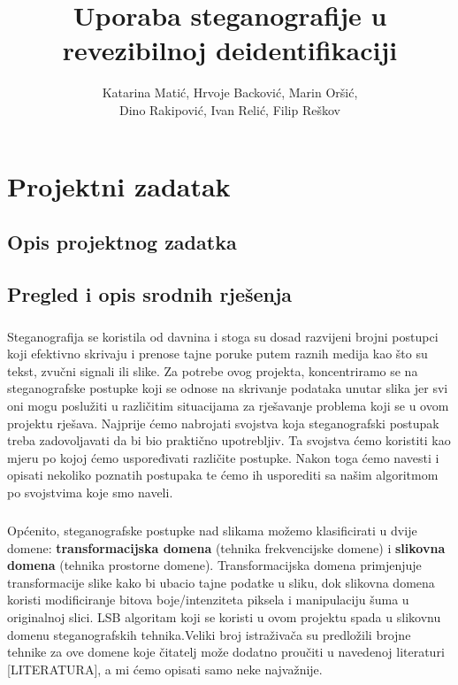 \documentclass[times, utf8, seminar]{fer}
\begin{document}
\title{Uporaba steganografije u revezibilnoj deidentifikaciji}

\author{	Katarina Matić,
	Hrvoje Backović,
	Marin Oršić,\\
	Dino Rakipović,
	Ivan Relić,
	Filip Reškov	}



\maketitle

\tableofcontents

\chapter{Projektni zadatak}
\section{Opis projektnog zadatka}
\section{Pregled i opis srodnih rješenja}

\paragraph{}
Steganografija se koristila od davnina i stoga su dosad razvijeni brojni postupci koji efektivno skrivaju i prenose tajne poruke putem raznih medija kao što su tekst, zvučni signali ili slike. Za potrebe ovog projekta, koncentriramo se na steganografske postupke koji se odnose na skrivanje podataka unutar slika jer svi oni mogu poslužiti u različitim situacijama za rješavanje problema koji se u ovom projektu rješava. Najprije ćemo nabrojati svojstva koja steganografski postupak treba zadovoljavati da bi bio praktično upotrebljiv. Ta svojstva ćemo koristiti kao mjeru po kojoj ćemo uspoređivati različite postupke. Nakon toga ćemo navesti i opisati nekoliko poznatih postupaka te ćemo ih usporediti sa našim algoritmom po svojstvima koje smo naveli.
\paragraph{}
Općenito, steganografske postupke nad slikama možemo klasificirati u dvije domene:
\textbf{transformacijska domena} (tehnika frekvencijske domene) i \textbf{slikovna domena} (tehnika prostorne domene). Transformacijska domena primjenjuje transformacije slike kako bi ubacio tajne podatke u sliku, dok slikovna domena koristi modificiranje bitova boje/intenziteta piksela i manipulaciju šuma u originalnoj slici. LSB algoritam koji se koristi u ovom projektu spada u slikovnu domenu steganografskih tehnika.Veliki broj istraživača su predložili brojne tehnike za ove domene koje čitatelj može dodatno proučiti u navedenoj literaturi [LITERATURA], a mi ćemo opisati samo neke najvažnije.
\end{document}
